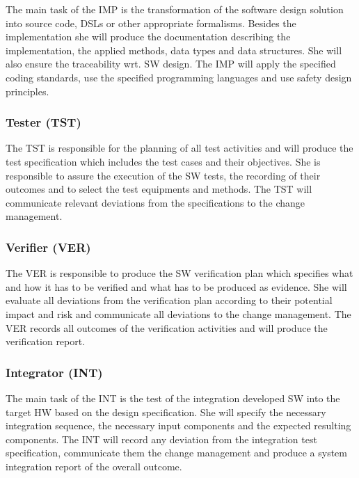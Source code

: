 The main task of the IMP is the transformation of the software design solution
into source code, DSLs or other appropriate formalisms. Besides the
implementation she will produce the documentation describing the implementation,
the applied methods, data types and data structures. She will also ensure the
traceability wrt. SW design. The IMP will apply the specified coding standards,
use the specified programming languages and use safety design principles.

\subsubsection{Tester (TST)}
\label{sec:tester}

The TST is responsible for the planning of all test activities and will produce
the test specification which includes the test cases and their objectives. She
is responsible to assure the execution of the SW tests, the recording of their
outcomes and to select the test equipments and methods. The TST will communicate
relevant deviations from the specifications to the change management.

\subsubsection{Verifier (VER)}
\label{sec:verifier}

The VER is responsible to produce the SW verification plan which specifies what
and how it has to be verified and what has to be produced as evidence. She will
evaluate all deviations from the verification plan according to their potential
impact and risk and communicate all deviations to the change management. The VER
records all outcomes of the verification activities and will produce the
verification report.

\subsubsection{Integrator (INT)}
\label{sec:integrator}

The main task of the INT is the test of the integration developed SW into the
target HW based on the design specification. She will specify the necessary
integration sequence, the necessary input components and the expected resulting
components. The INT will record any deviation from the integration test
specification, communicate them the change management and produce a system
integration report of the overall outcome.

